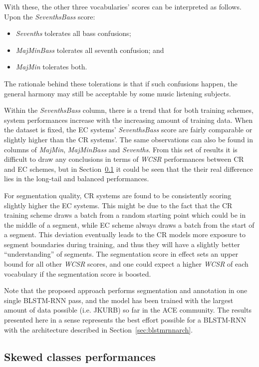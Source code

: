 With these, the other three vocabularies' scores can be interpreted as follows. Upon the \textit{SeventhsBass} score:
\begin{itemize}
	\item \textit{Sevenths} tolerates all bass confusions;
	\item \textit{MajMinBass} tolerates all seventh confusion; and
	\item \textit{MajMin} tolerates both.
\end{itemize}
The rationale behind these tolerations is that if such confusions happen, the general harmony may still be acceptable by some music listening subjects.

Within the \textit{SeventhsBass} column, there is a trend that for both training schemes, system performances increase with the increasing amount of training data. When the dataset is fixed, the EC systems' \textit{SeventhsBass} score are fairly comparable or slightly higher than the CR systems'. The same observations can also be found in columns of \textit{MajMin}, \textit{MajMinBass} and \textit{Sevenths}. From this set of results it is difficult to draw any conclusions in terms of \textit{WCSR} performances between CR and EC schemes, but in Section~\ref{sec:4-scper} it could be seen that the their real difference lies in the long-tail and balanced performances.

For segmentation quality, CR systems are found to be consistently scoring slightly higher the EC systems. This might be due to the fact that the CR training scheme draws a batch from a random starting point which could be in the middle of a segment, while EC scheme always draws a batch from the start of a segment. This deviation eventually leads to the CR models more exposure to segment boundaries during training, and thus they will have a slightly better ``understanding'' of segments. The segmentation score in effect sets an upper bound for all other \textit{WCSR} scores, and one could expect a higher \textit{WCSR} of each vocabulary if the segmentation score is boosted.

Note that the proposed approach performs segmentation and annotation in one single BLSTM-RNN pass, and the model has been trained with the largest amount of data possible (i.e. JKURB) so far in the ACE community. The results presented here in a sense represents the best effort possible for a BLSTM-RNN with the architecture described in Section~\ref{sec:blstmrnnarch}.

\subsection{Skewed classes performances} \label{sec:4-scper}

